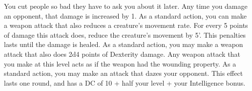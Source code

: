 {You cut people so bad they have to ask you about it later.}
{Any time you damage an opponent, that damage is increased by 1.}
{As a standard action, you can make a weapon attack that also reduces a creature's movement rate. For every 5 points of damage this attack does, reduce the creature's movement by 5'. This penalties lasts until the damage is healed.}
{As a standard action, you may make a weapon attack that also does 2d4 points of Dexterity damage.}
{Any weapon attack that you make at this level acts as if the weapon had the wounding property.}
{As a standard action, you may make an attack that dazes your opponent. This effect lasts one round, and has a DC of 10 + half your level + your Intelligence bonus.}